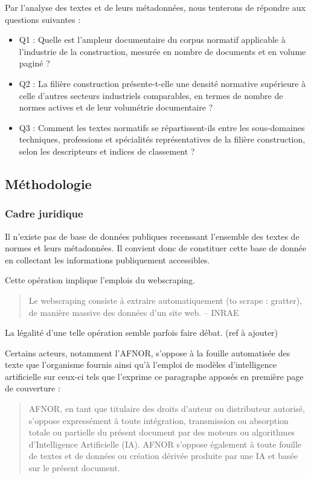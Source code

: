 \documentclass[a4paper,12pt]{article}
\begin{document}
Par l'analyse des textes et de leurs métadonnées, nous tenterons de répondre aux questions suivantes :

\begin{itemize}
\item Q1 : Quelle est l’ampleur documentaire du corpus normatif applicable à l’industrie de la construction, mesurée en nombre de documents et en volume paginé ?
\item Q2 : La filière construction présente-t-elle une densité normative supérieure à celle d’autres secteurs industriels comparables, en termes de nombre de normes actives et de leur volumétrie documentaire ?
\item Q3 : Comment les textes normatifs se répartissent-ils entre les sous-domaines techniques, professions et spécialités représentatives de la filière construction, selon les descripteurs et indices de classement ?
\end{itemize}
\subsection{Méthodologie}
\label{sec:org44de3a1}
\subsubsection{Cadre juridique}
\label{sec:org4e2f1c1}
Il n'existe pas de base de données publiques recenssant l'ensemble des textes de normes et leurs métadonnées. Il convient donc de constituer cette base de donnée en collectant les informations publiquement accessibles.

Cette opération implique l'emplois du webscraping.

\begin{quote}
Le webscraping consiste à extraire automatiquement (to scrape : gratter), de manière massive des données d'un site web. -- INRAE\autocite{quesnevilleRecommandationsUsagesWebscraping2024}
\end{quote}

La légalité d'une telle opération semble parfois faire débat. (ref à ajouter)

Certains acteurs, notamment l'AFNOR, s'oppose à la fouille automatisée des texte que l'organisme fournis ainsi qu'à l'emploi de modèles d'intelligence artificielle sur ceux-ci tels que l'exprime ce paragraphe apposés en première page de couverture :
\begin{quote}
AFNOR, en tant que titulaire des droits d’auteur ou distributeur autorisé, s’oppose expressément à toute intégration, transmission ou absorption totale ou partielle du présent document par des moteurs ou algorithmes d’Intelligence Artificielle (IA). AFNOR s’oppose également à toute fouille de textes et de données ou création dérivée produite par une IA et basée sur le présent document.
\end{quote}
\end{document}
